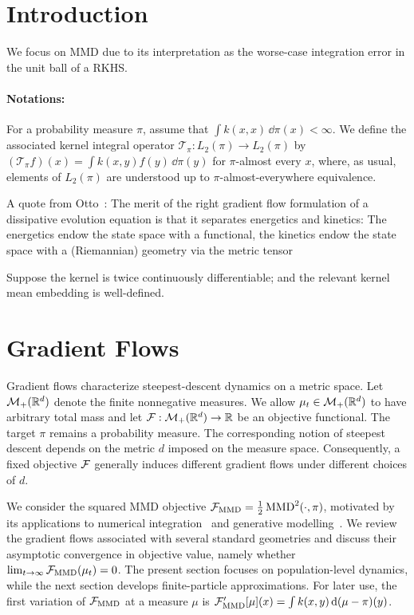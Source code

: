 
\section{Introduction}
We focus on MMD due to its interpretation as the worse-case integration error in the unit ball of a RKHS. 


\paragraph{Notations:}
For a probability measure $\pi$, assume that $\int k(x,x)\,\dd\pi(x)<\infty$. We define the associated kernel integral operator $\mathcal{T}_\pi:L_2(\pi)\to L_2(\pi)$ by $(\mathcal{T}_\pi f)(x)=\int k(x,y)f(y)\,\dd\pi(y)$ for $\pi$-almost every $x$, where, as usual, elements of $L_2(\pi)$ are understood up to $\pi$-almost-everywhere equivalence. 


A quote from Otto~\citep{otto2001geometry}:
The merit of the right gradient flow formulation of a dissipative evolution
equation is that it separates energetics and kinetics: The energetics endow
the state space with a functional, the kinetics endow the state space with a
(Riemannian) geometry via the metric tensor

\begin{ass}[Kernel]
    Suppose the kernel is twice continuously differentiable; and the relevant kernel mean embedding is well-defined. 
\end{ass}


\section{Gradient Flows}\label{sec:gf}
Gradient flows characterize steepest-descent dynamics on a metric space. Let $\mathcal{M}_+(\mathbb{R}^d)$ denote the finite nonnegative measures. We allow $\mu_t\in\mathcal{M}_+(\mathbb{R}^d)$ to have arbitrary total mass and let $\mathcal{F}:\mathcal{M}_+(\mathbb{R}^d)\to\mathbb{R}$ be an objective functional. The target $\pi$ remains a probability measure. The corresponding notion of steepest descent depends on the metric $d$ imposed on the measure space. Consequently, a fixed objective $\mathcal{F}$ generally induces different gradient flows under different choices of $d$.


We consider the squared MMD objective $\mathcal{F}_{\operatorname{MMD}}=\frac{1}{2}\operatorname{MMD}^2(\cdot,\pi)$, motivated by its applications to numerical integration~\citep{chen2025stationary} and generative modelling~\citep{li2017mmd,arbel2018gradient,arbel2019maximum}. We review the gradient flows associated with several standard geometries and discuss their asymptotic convergence in objective value, namely whether $\lim_{t\to\infty}\mathcal{F}_{\operatorname{MMD}}(\mu_t)=0$. The present section focuses on population-level dynamics, while the next section develops finite-particle approximations. 
For later use, the first variation of $\mathcal{F}_{\operatorname{MMD}}$ at a measure $\mu$ is $\mathcal{F}'_{\operatorname{MMD}}[\mu](x)=\int k(x,y)\,\mathrm{d}(\mu-\pi)(y)$. 

